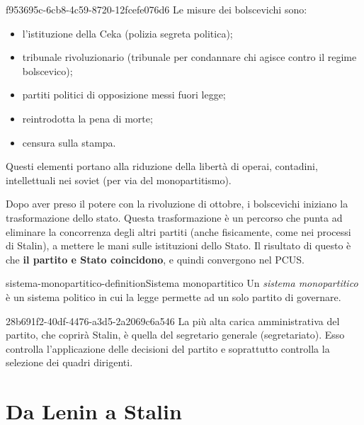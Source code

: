 \documentclass[preview]{standalone}
\begin{document}
\begin{snippet}{f953695c-6cb8-4c59-8720-12fcefe076d6}
    Le misure dei bolscevichi sono:
    \begin{itemize}
        \item l'istituzione della Ceka (polizia segreta politica);
        \item tribunale rivoluzionario (tribunale per condannare chi agisce contro il regime bolscevico);
        \item partiti politici di opposizione messi fuori legge;
        \item reintrodotta la pena di morte;
        \item censura sulla stampa.
    \end{itemize}
    Questi elementi portano alla riduzione della libertà di operai, contadini, intellettuali
    nei soviet (per via del monopartitismo).
    
    Dopo aver preso il potere con la rivoluzione di ottobre, i bolscevichi iniziano la trasformazione
    dello stato. Questa trasformazione è un percorso che punta ad eliminare la concorrenza
    degli altri partiti (anche fisicamente, come nei processi di Stalin),
    a mettere le mani sulle istituzioni dello Stato.
    Il risultato di questo è che \textbf{il partito e Stato coincidono},
    e quindi convergono nel PCUS.
\end{snippet}

\begin{snippetdefinition}{sistema-monopartitico-definition}{Sistema monopartitico}
    Un \textit{sistema monopartitico} è un sistema politico in cui la legge
    permette ad un solo partito di governare.
\end{snippetdefinition}

\begin{snippet}{28b691f2-40df-4476-a3d5-2a2069c6a546}
    La più alta carica amministrativa del partito, che coprirà Stalin,
    è quella del segretario generale (segretariato).
    Esso controlla l'applicazione delle decisioni del partito e soprattutto controlla
    la selezione dei quadri dirigenti.
\end{snippet}

\section{Da Lenin a Stalin}
\end{document}
